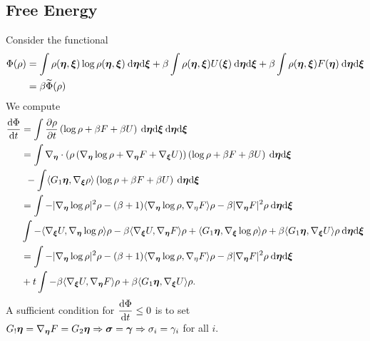 \documentclass[11pt,twoside,a4paper]{article}
\begin{document}
\subsection{Free Energy}
Consider the functional 
\begin{align}
    \Phi(\rho)& =\int \rho({\bm{\eta}},{\bm{\xi}}) \log  \rho({\bm{\eta}},{\bm{\xi}}) \: {\rm{d}} {\bm{\eta}} {\rm{d}} {\bm{\xi}}  + \beta
    \int \rho({\bm{\eta}},{\bm{\xi}}) U({\bm{\xi}})\: {\rm{d}} {\bm{\eta}} {\rm{d}} {\bm{\xi}}  
    +
   \beta \int \rho({\bm{\eta}},{\bm{\xi}}) F({\bm{\eta}}) \: {\rm{d}} {\bm{\eta}} {\rm{d}} {\bm{\xi}} \nonumber \\ 
   & = \beta \widetilde{\Phi}(\rho) 
\end{align}
We compute 
\begin{align}
    \frac{{\rm{d}} \Phi}{{\rm{d}} t}&=\int \frac{\partial \rho}{\partial t} \left( \log \rho + \beta F +  \beta U\right)\: {\rm{d}} {\bm{\eta}} {\rm{d}} {\bm{\xi}} \: {\rm{d}} {\bm{\eta}} {\rm{d}} {\bm{\xi}}    \nonumber \\
    &  = \int \nabla_{{\bm{\eta}}} \cdot \left( \rho \left( \nabla_{{\bm{\eta}}} \log \rho+ \nabla_{{\bm{\eta}}} F + \nabla_{{\bm{\xi}} }U\right)\right) \left( \log \rho + \beta F +  \beta U\right) \: {\rm{d}} {\bm{\eta}} {\rm{d}} {\bm{\xi}}   \nonumber \\ 
    & \: \: -  \int \langle G_1{\bm{\eta}} , \nabla_{{\bm{\xi}}} \rho \rangle \left( \log \rho + \beta F + \beta U\right)\: {\rm{d}} {\bm{\eta}} {\rm{d}} {\bm{\xi}}   \nonumber \\ 
    & = \int - \lvert \nabla_{{\bm{\eta}}} \log \rho \lvert^2\rho  -( \beta+1) \langle \nabla_{{\bm{\eta}}} \log \rho ,\nabla_{\eta}F\rangle\rho    - \beta \lvert \nabla_{{\bm{\eta}}} F \rvert^2\rho \: {\rm{d}} {\bm{\eta}} {\rm{d}} {\bm{\xi}}   \nonumber \\ 
    &  \int -\langle \nabla_{{\bm{\xi}}} U , \nabla_{
    {\bm{\eta}}} \log \rho \rangle\rho  -\beta \langle \nabla_{{\bm{\xi}}} U , \nabla_{
    {\bm{\eta}}} F \rangle\rho  + \langle G_1 {\bm{\eta}}, \nabla_{{\bm{\xi}}} \log \rho\rangle \rho  + \beta  \langle G_1 {\bm{\eta}}, \nabla_{{\bm{\xi}}} U \rangle\rho  \: {\rm{d}} {\bm{\eta}} {\rm{d}} {\bm{\xi}}   \nonumber  \\
    & = \int - \lvert \nabla_{{\bm{\eta}}} \log \rho \lvert^2\rho  - (\beta+1) \langle \nabla_{{\bm{\eta}}} \log \rho ,\nabla_{\eta}F\rangle\rho    - \beta \lvert \nabla_{{\bm{\eta}}} F \rvert^2\rho \: {\rm{d}} {\bm{\eta}} {\rm{d}} {\bm{\xi}}   \nonumber \\
    &+t  \int -\beta \langle \nabla_{{\bm{\xi}}} U , \nabla_{
    {\bm{\eta}}} F \rangle\rho +  \beta  \langle G_1 {\bm{\eta}}, \nabla_{{\bm{\xi}}} U \rangle\rho. \nonumber 
\end{align}
A sufficient condition for $  \dfrac{{\rm{d}} \Phi}{{\rm{d}} t}\leq 0$ is to set  $G_!{\bm{\eta}} =\nabla_{{\bm{\eta}}} F = G_2 {\bm{\eta}} \Rightarrow 
{\bm{\sigma}} = {\bm{\gamma}} \Rightarrow \sigma_i=\gamma_i$ for all $i$.
\end{document}
